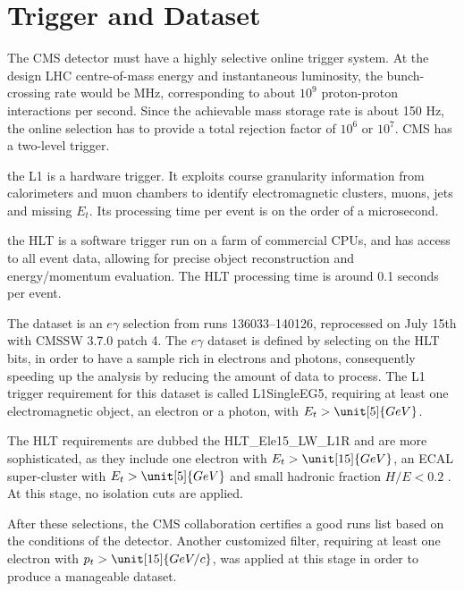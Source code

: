      \section{Trigger and Dataset}
     The CMS detector must have a highly selective online trigger system. At the design LHC centre-of-mass energy and instantaneous luminosity, the bunch-crossing rate would be \unit[40]{MHz}, corresponding to about $10^9$ proton-proton interactions per second. Since the achievable mass storage rate is about 150 Hz, the online selection has to provide a total rejection factor of $10^6$ or $10^7$.
     CMS has a two-level trigger.
     \begin{packed_description}
         \item[Level 1 Trigger (L1):] the L1 is a hardware trigger. It exploits course granularity information from calorimeters and muon chambers to identify electromagnetic clusters, muons, jets and missing $E_t$. Its processing time per event is on the order of a microsecond.
         \item[High Level Trigger (HLT):] the HLT is a software trigger run on a farm of commercial CPUs, and has access to all event data, allowing for precise object reconstruction and energy/momentum evaluation. The HLT processing time is around 0.1 seconds per event.
     \end{packed_description}
     The dataset is an \qmo{}$e\gamma$\qmc{} selection from runs 136033--140126, reprocessed on July 15th with CMSSW 3.7.0 patch 4. The $e\gamma$ dataset is defined by selecting on the HLT bits, in order to have a sample rich in electrons and photons, consequently speeding up the analysis by reducing the amount of data to process. The L1 trigger requirement for this dataset is called \qmo{}L1SingleEG5\qmc{}, requiring at least one electromagnetic object,  an electron or a photon, with $E_t > \unit[5]{GeV}$.

     The HLT requirements are dubbed the HLT\_Ele15\_LW\_L1R and are more sophisticated, as they include one electron with $E_t > \unit[15]{GeV}$, an ECAL super-cluster with $E_t > \unit[5]{GeV}$ and small hadronic fraction $H/E < 0.2$ . At this stage, no isolation cuts are applied.
     
     After these selections, the CMS collaboration certifies a \qmo{}good runs\qmc{} list based on the conditions of the detector. Another customized filter, requiring at least one electron with $p_t > \unit[15]{GeV/c}$, was applied at this stage in order to produce a manageable dataset.

